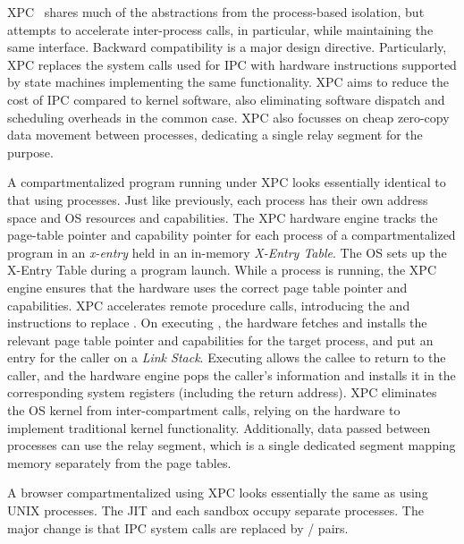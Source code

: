 XPC~\cite{DuHXZC19XPC} shares much of the abstractions from the process-based
isolation, but attempts to accelerate inter-process calls, in particular, 
while maintaining the same interface.
Backward compatibility is a major design directive.
Particularly, XPC replaces the system calls used for IPC with hardware 
instructions supported by state machines implementing the same functionality.
XPC aims to reduce the cost of IPC compared to kernel software, 
also eliminating software dispatch and scheduling overheads in the common case.
XPC also focusses on cheap zero-copy data movement between processes,
dedicating a single relay segment for the purpose.

A compartmentalized program running under XPC looks essentially identical
to that using processes.
Just like previously, each process has their own address space and OS 
resources and capabilities.
The XPC hardware engine tracks the page-table pointer and capability pointer
for each process of a compartmentalized program in an \emph{x-entry} held in
an in-memory \emph{X-Entry Table}.
The OS sets up the X-Entry Table during a program launch.
While a process is running, the XPC engine ensures that the hardware uses the
correct page table pointer and capabilities.
XPC accelerates remote procedure calls, introducing the  and
 instructions to replace .
On executing , the hardware fetches and installs the relevant 
page table pointer and capabilities for the target process, 
and put an entry for the caller on a \emph{Link Stack}.
Executing  allows the callee to return to the caller, and the
hardware engine pops the caller's information and installs it in the
corresponding system registers (including the return address). 
XPC eliminates the OS kernel from inter-compartment calls, relying on the 
hardware to implement traditional kernel functionality.
Additionally, data passed between processes can use the relay segment, which
is a single dedicated segment mapping memory separately from the page tables.

A browser compartmentalized using XPC looks essentially the same as
using UNIX processes. 
The JIT and each sandbox occupy separate processes.
The major change is that IPC system calls are replaced by 
/ pairs.

